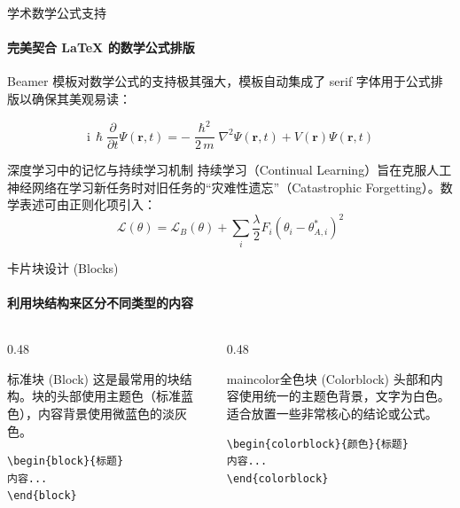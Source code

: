 \documentclass{beamer}
\begin{document}
\begin{frame}{学术数学公式支持}
\framesubtitle{完美契合 LaTeX 的数学公式排版}

Beamer 模板对数学公式的支持极其强大，模板自动集成了 serif 字体用于公式排版以确保其美观易读：

\begin{equation}
\mathrm{i}\,\hslash\frac{\partial}{\partial t} \Psi(\mathbf{r},t) =
-\frac{\hslash^2}{2\,m}\nabla^2\Psi(\mathbf{r},t)
+ V(\mathbf{r})\Psi(\mathbf{r},t)
\end{equation}

\begin{block}{深度学习中的记忆与持续学习机制}
持续学习（Continual Learning）旨在克服人工神经网络在学习新任务时对旧任务的“灾难性遗忘”（Catastrophic Forgetting）。数学表述可由正则化项引入：
\begin{equation*}
\mathcal{L}(\theta) = \mathcal{L}_B(\theta) + \sum_{i} \frac{\lambda}{2} F_i (\theta_i - \theta_{A,i}^*)^2
\end{equation*}
\end{block}

\end{frame}

\begin{frame}[fragile]{卡片块设计 (Blocks)}
\framesubtitle{利用块结构来区分不同类型的内容}

\begin{columns}
\begin{column}{0.48\textwidth}
\begin{block}{标准块 (Block)}
这是最常用的块结构。块的头部使用主题色（标准蓝色），内容背景使用微蓝色的淡灰色。
\small
\begin{verbatim}
\begin{block}{标题}
内容...
\end{block}
\end{verbatim}
\end{block}
\end{column}

\begin{column}{0.48\textwidth}
\begin{colorblock}[white]{maincolor}{全色块 (Colorblock)}
头部和内容使用统一的主题色背景，文字为白色。适合放置一些非常核心的结论或公式。
\small
\begin{verbatim}
\begin{colorblock}{颜色}{标题}
内容...
\end{colorblock}
\end{verbatim}
\end{colorblock}
\end{column}
\end{columns}
\end{frame}
\end{document}
